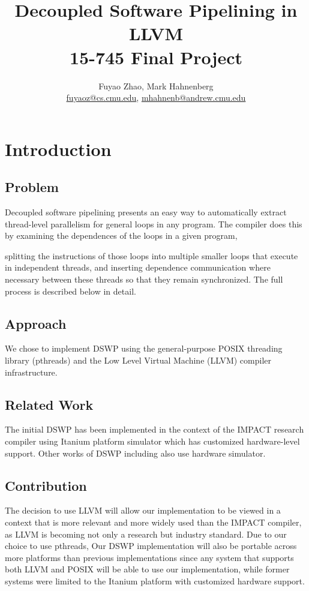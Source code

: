 \documentclass[11pt, letter]{article}
\title{Decoupled Software Pipelining in LLVM \\
        {\large 15-745 Final Project}}
\author{Fuyao Zhao, Mark Hahnenberg\\
\url{fuyaoz@cs.cmu.edu}, \url{mhahnenb@andrew.cmu.edu}
}
\date{}
\begin{document}
\maketitle

\section{Introduction}
\subsection{Problem}
Decoupled software pipelining \cite{DSWP} presents an easy way to automatically extract thread-level parallelism for general loops in any program.  The compiler does this by examining the dependences of the loops in a given program, 


splitting the instructions of those loops into multiple smaller loops that execute in independent threads, and inserting dependence communication where necessary between these threads so that they remain synchronized.  The full process is described below in detail.  

\subsection{Approach}
We chose to implement DSWP using the general-purpose POSIX threading library (pthreads) and the Low Level Virtual Machine (LLVM) compiler infrastructure.  

\subsection{Related Work}
The initial DSWP has been implemented in the context of the IMPACT research compiler using Itanium platform simulator which has customized hardware-level support. Other works of DSWP including \cite{Sp-DSWP,PS-DSWP} also use hardware simulator.

\subsection{Contribution}
The decision to use LLVM will allow our implementation to be viewed in a context that is more relevant and more widely used than the IMPACT compiler, as LLVM is becoming not only a research but industry standard.  Due to our choice to use pthreads, Our DSWP implementation will also be portable across more platforms than previous implementations since any system that supports both LLVM and POSIX will be able to use our implementation, while former systems were limited to the Itanium platform with customized hardware support.
\end{document}

